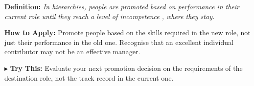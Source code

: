 \begin{tcolorbox}[title={\small \textbf{23 | The Peter Principle}},
  colback=blue!5!white, colframe=blue!40!black,
  fonttitle=\bfseries\small, boxrule=0.5pt]
\textbf{Definition:} \textit{In hierarchies, people are promoted based on performance in their current role until they reach a level of incompetence , where they stay.}

\medskip
\textbf{How to Apply:} Promote people based on the skills required in the new role, not just their performance in the old one. Recognise that an excellent individual contributor may not be an effective manager.

\medskip
$\blacktriangleright$ \textbf{Try This:} Evaluate your next promotion decision on the requirements of the destination role, not the track record in the current one.
\end{tcolorbox}
